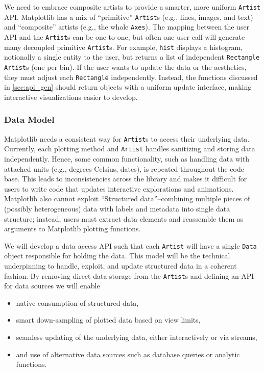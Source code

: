 \documentclass[11pt,letterpaper]{article}  %
\begin{document}
We need to embrace composite artists to provide a smarter, more uniform \texttt{Artist} API.
Matplotlib has a mix of ``primitive'' \texttt{Artist}s (e.g., lines, images, and text) and ``composite'' artists (e.g., the whole \texttt{Axes}). The mapping between the user API and the \texttt{Artist}s can be
one-to-one, but often one user call will generate many decoupled primitive \texttt{Artist}s.
For example, \texttt{hist} displays a histogram, notionally a single entity to the user,
but returns a list of independent \texttt{Rectangle} \texttt{Artist}s (one per bin).
If the user wants to update the data or the aesthetics, they must adjust each \texttt{Rectangle} independently.
Instead, the functions discussed in \ref{sec:api_gen} should return objects with
a uniform update interface, making interactive visualizations easier to develop.


\subsubsection{Data Model}
\label{sec:dm}
Matplotlib needs a consistent way for \texttt{Artist}s to access their
underlying data. Currently, each plotting method and \texttt{Artist}
handles sanitizing and storing data independently. Hence, some common
functionality, such as handling data with attached units (e.g.,
degrees Celsius, dates), is repeated throughout the code base. This
leads to inconsistencies across the library and makes it difficult for
users to write code that updates interactive explorations and
animations. Matplotlib also cannot exploit ``Structured
data''--combining multiple pieces of (possibly heterogeneous) data
with labels and metadata into single data structure; instead, users
must extract data elements and reassemble them as arguments to
Matplotlib plotting functions.

We will develop a data access API such that each \texttt{Artist} will have a single \texttt{Data} object responsible for holding the data. This model will be the technical underpinning to handle, exploit, and
update structured data in a coherent fashion. By removing direct data storage from the \texttt{Artist}s and defining an API for data sources we will enable

\begin{itemize}[noitemsep]
  \item native consumption of structured data,
  \item smart down-sampling of plotted data based on view limits,
  \item seamless updating of the underlying data, either interactively or via streams,
  \item and use of alternative data sources such as database queries or analytic functions.
\end{itemize}
\end{document}
